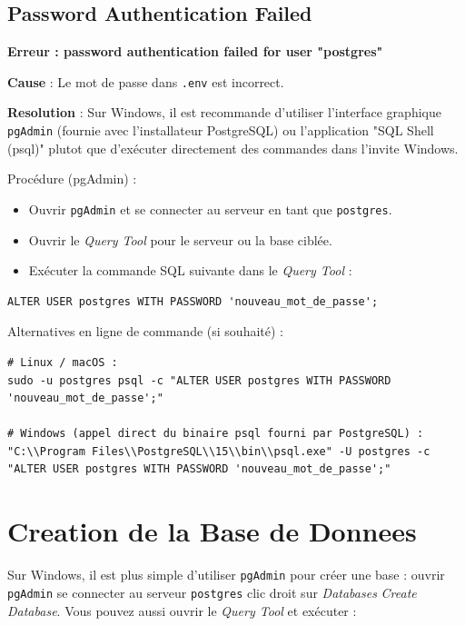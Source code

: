 \documentclass[a4paper,12pt]{book}
\begin{document}
\subsection{Password Authentication Failed}

\begin{errorbox}
    \textbf{Erreur : password authentication failed for user "postgres"}

    \textbf{Cause} : Le mot de passe dans \texttt{.env} est incorrect.

    \textbf{Resolution} :
    Sur Windows, il est recommande d'utiliser l'interface graphique \texttt{pgAdmin}
    (fournie avec l'installateur PostgreSQL) ou l'application "SQL Shell (psql)"
    plutot que d'exécuter directement des commandes dans l'invite Windows.

    Procédure (pgAdmin) :
    \begin{itemize}
        \item Ouvrir \texttt{pgAdmin} et se connecter au serveur en tant que \texttt{postgres}.
        \item Ouvrir le \emph{Query Tool} pour le serveur ou la base ciblée.
        \item Exécuter la commande SQL suivante dans le \emph{Query Tool} :
    \end{itemize}

    \begin{lstlisting}[style=sql]
ALTER USER postgres WITH PASSWORD 'nouveau_mot_de_passe';
    \end{lstlisting}

    Alternatives en ligne de commande (si souhaité) :
    \begin{lstlisting}[style=bash]
# Linux / macOS :
sudo -u postgres psql -c "ALTER USER postgres WITH PASSWORD 'nouveau_mot_de_passe';"

# Windows (appel direct du binaire psql fourni par PostgreSQL) :
"C:\\Program Files\\PostgreSQL\\15\\bin\\psql.exe" -U postgres -c "ALTER USER postgres WITH PASSWORD 'nouveau_mot_de_passe';"
    \end{lstlisting}
\end{errorbox}

\section{Creation de la Base de Donnees}
Sur Windows, il est plus simple d'utiliser \texttt{pgAdmin} pour créer une base :
ouvrir \texttt{pgAdmin} \rightarrow se connecter au serveur \texttt{postgres} \rightarrow
clic droit sur \emph{Databases} \rightarrow \emph{Create} \rightarrow \emph{Database}.
Vous pouvez aussi ouvrir le \emph{Query Tool} et exécuter :
\end{document}
